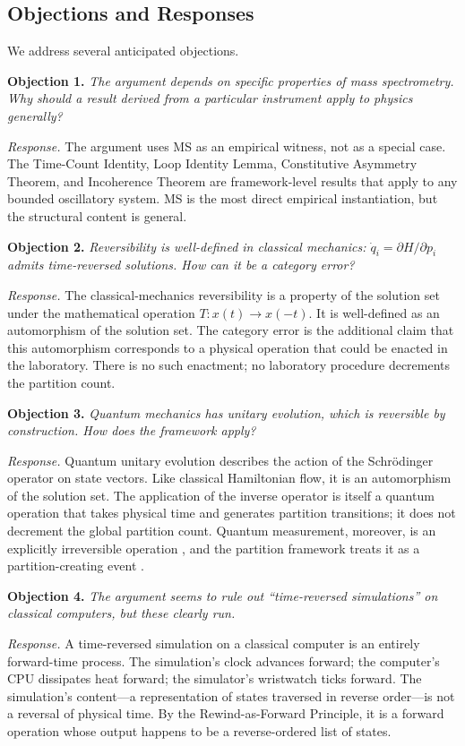 \documentclass[twocolumn,10pt,a4paper]{article}
\theoremstyle{definition}
\theoremstyle{remark}
\begin{document}
\subsection{Objections and Responses}

We address several anticipated objections.

\textbf{Objection 1.} \emph{The argument depends on specific properties of mass spectrometry. Why should a result derived from a particular instrument apply to physics generally?}

\emph{Response.} The argument uses MS as an empirical witness, not as a special case. The Time-Count Identity, Loop Identity Lemma, Constitutive Asymmetry Theorem, and Incoherence Theorem are framework-level results that apply to any bounded oscillatory system. MS is the most direct empirical instantiation, but the structural content is general.

\textbf{Objection 2.} \emph{Reversibility is well-defined in classical mechanics: $\dot{q}_i = \partial H/\partial p_i$ admits time-reversed solutions. How can it be a category error?}

\emph{Response.} The classical-mechanics reversibility is a property of the solution set under the mathematical operation $T: x(t) \to x(-t)$. It is well-defined as an automorphism of the solution set. The category error is the additional claim that this automorphism corresponds to a physical operation that could be enacted in the laboratory. There is no such enactment; no laboratory procedure decrements the partition count.

\textbf{Objection 3.} \emph{Quantum mechanics has unitary evolution, which is reversible by construction. How does the framework apply?}

\emph{Response.} Quantum unitary evolution describes the action of the Schrödinger operator on state vectors. Like classical Hamiltonian flow, it is an automorphism of the solution set. The application of the inverse operator is itself a quantum operation that takes physical time and generates partition transitions; it does not decrement the global partition count. Quantum measurement, moreover, is an explicitly irreversible operation \citep{vonneumann1932}, and the partition framework treats it as a partition-creating event \citep{sachikonye2025loschmidt}.

\textbf{Objection 4.} \emph{The argument seems to rule out ``time-reversed simulations'' on classical computers, but these clearly run.}

\emph{Response.} A time-reversed simulation on a classical computer is an entirely forward-time process. The simulation's clock advances forward; the computer's CPU dissipates heat forward; the simulator's wristwatch ticks forward. The simulation's content---a representation of states traversed in reverse order---is not a reversal of physical time. By the Rewind-as-Forward Principle, it is a forward operation whose output happens to be a reverse-ordered list of states.
\end{document}
